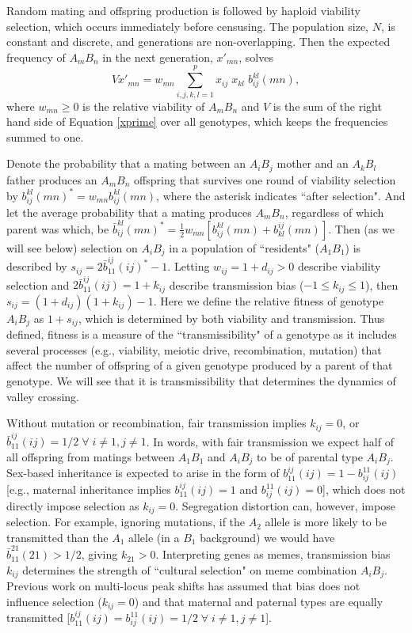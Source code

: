 \documentclass[review,3p,authoryear]{elsarticle}
\begin{document}
Random mating and offspring production is followed by haploid viability selection, which occurs immediately before censusing.
The population size, $N$, is constant and discrete, and generations are non-overlapping.
Then the expected frequency of $A_mB_n$ in the next generation, $x'_{mn}$, solves
\begin{equation}\label{xprime}
V x'_{mn} = w_{mn} \sum_{i,j,k,l=1}^{p} x_{ij}\; x_{kl}\; b_{ij}^{kl}(mn),
\end{equation}
where $w_{mn}\geq0$ is the relative viability of $A_mB_n$ and $V$ is the sum of the right hand side of Equation \eqref{xprime} over all genotypes, which keeps the frequencies summed to one.

Denote the probability that a mating between an $A_iB_j$ mother and an $A_kB_l$ father produces an $A_mB_n$ offspring that survives one round of viability selection by $b_{ij}^{kl}(mn)^* = w_{mn} b_{ij}^{kl}(mn)$, where the asterisk indicates ``after selection". 
And let the average probability that a mating produces $A_mB_n$, regardless of which parent was which, be $\bar{b}_{ij}^{kl}(mn)^* = \frac{1}{2} w_{mn} [b_{ij}^{kl}(mn) + b_{kl}^{ij}(mn)]$.
Then (as we will see below) selection on $A_iB_j$ in a population of ``residents" ($A_1B_1$) is described by $s_{ij} = 2\bar{b}_{11}^{ij}(ij)^* - 1$.
Letting $w_{ij} = 1 + d_{ij} > 0$ describe viability selection and $2\bar{b}_{11}^{ij}(ij) = 1 + k_{ij}$ describe transmission bias ($-1 \leq k_{ij} \leq 1$), then $s_{ij}=(1+d_{ij})(1+k_{ij})-1$.
Here we define the relative fitness of genotype $A_iB_j$ as $1+s_{ij}$, which is determined by both viability and transmission.
Thus defined, fitness is a measure of the ``transmissibility" of a genotype as it includes several processes (e.g., viability, meiotic drive, recombination, mutation) that affect the number of offspring of a given genotype produced by a parent of that genotype.
We will see that it is transmissibility that determines the dynamics of valley crossing.

Without mutation or recombination, fair transmission implies $k_{ij}=0$, or $\bar{b}_{11}^{ij}(ij)=1/2 \; \forall \; i\neq1, j\neq1$. 
In words, with fair transmission we expect half of all offspring from matings between $A_1B_1$ and $A_iB_j$ to be of parental type $A_iB_j$.
Sex-based inheritance is expected to arise in the form of $b_{11}^{ij}(ij) = 1 - b_{ij}^{11}(ij)$ [e.g., maternal inheritance implies $b_{11}^{ij}(ij) = 1$ and $b_{ij}^{11}(ij) = 0$], which does not directly impose selection as $k_{ij}=0$.
Segregation distortion can, however, impose selection.
For example, ignoring mutations, if the $A_2$ allele is more likely to be transmitted than the $A_1$ allele (in a $B_1$ background) we would have $\bar{b}_{11}^{21}(21) > 1/2$, giving $k_{21}>0$.
Interpreting genes as memes, transmission bias $k_{ij}$ determines the strength of ``cultural selection" \citep[\textit{sensu}][]{CavalliSforza1981} on meme combination $A_iB_j$.
Previous work on multi-locus peak shifts has assumed that bias does not influence selection ($k_{ij}=0$) and that maternal and paternal types are equally transmitted [$b_{11}^{ij}(ij) = b_{ij}^{11}(ij) = 1/2 \; \forall \; i\neq1, j\neq1$].
\end{document}

